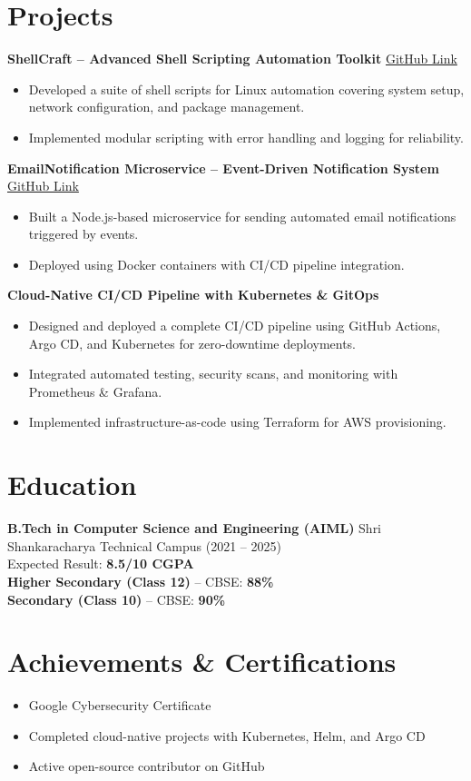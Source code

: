 \documentclass[a4paper,10pt]{article}
\begin{document}
\section{Projects}
\textbf{ShellCraft – Advanced Shell Scripting Automation Toolkit} \hfill \href{https://github.com/Anurag-xo/shellcraft}{GitHub Link} \\
\begin{itemize}
    \item Developed a suite of shell scripts for Linux automation covering system setup, network configuration, and package management.
    \item Implemented modular scripting with error handling and logging for reliability.
\end{itemize}

\textbf{EmailNotification Microservice – Event-Driven Notification System} \hfill \href{https://github.com/Anurag-xo/EmailNotification-microservice}{GitHub Link} \\
\begin{itemize}
    \item Built a Node.js-based microservice for sending automated email notifications triggered by events.
    \item Deployed using Docker containers with CI/CD pipeline integration.
\end{itemize}

\textbf{Cloud-Native CI/CD Pipeline with Kubernetes \& GitOps} \\
\begin{itemize}
    \item Designed and deployed a complete CI/CD pipeline using GitHub Actions, Argo CD, and Kubernetes for zero-downtime deployments.
    \item Integrated automated testing, security scans, and monitoring with Prometheus \& Grafana.
    \item Implemented infrastructure-as-code using Terraform for AWS provisioning.
\end{itemize}

\section{Education}
\textbf{B.Tech in Computer Science and Engineering (AIML)} \hfill Shri Shankaracharya Technical Campus (2021 – 2025) \\
Expected Result: \textbf{8.5/10 CGPA} \\
\textbf{Higher Secondary (Class 12)} – CBSE: \textbf{88\%} \\
\textbf{Secondary (Class 10)} – CBSE: \textbf{90\%}

\section{Achievements \& Certifications}
\begin{itemize}
    \item Google Cybersecurity Certificate
    \item Completed cloud-native projects with Kubernetes, Helm, and Argo CD
    \item Active open-source contributor on GitHub
\end{itemize}
\end{document}
